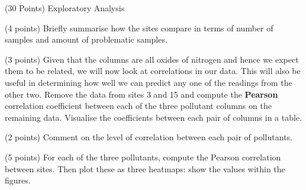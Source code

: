 \documentclass[12pt]{article}
\begin{document}
\begin{question}{\label{Q_EXPLORATORY}(30 Points) Exploratory Analysis}
\begin{subquestion}{(4 points) Briefly summarise how the sites compare in terms of number of samples and amount of problematic samples.}
\end{subquestion}

\begin{subquestion}{(3 points) Given that the columns are all oxides of nitrogen and hence we expect them to be related, we will now look at correlations in our data. This will also be useful in determining how well we can predict any one of the readings from the other two. Remove the data from sites 3 and 15 and compute the \textbf{Pearson} correlation coefficient between each of the three pollutant columns on the remaining data. Visualise the coefficients between each pair of columns in a table.}






\end{subquestion}

\begin{subquestion}{(2 points) Comment on the level of correlation between each pair of pollutants.}






\end{subquestion}



\begin{subquestion}{\label{CORRELATIONS}(5 points) For each of the three pollutants, compute the Pearson correlation between sites.  Then plot these as three heatmaps: show the values within the figures. }




\end{subquestion}
\end{question}
\end{document}
